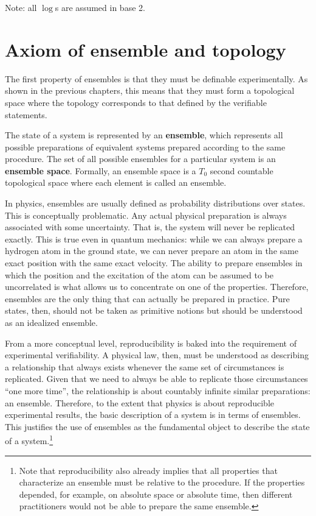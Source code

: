 Note: all $\log$s are assumed in base 2.

\section{Axiom of ensemble and topology}

The first property of ensembles is that they must be definable experimentally. As shown in the previous chapters, this means that they must form a topological space where the topology corresponds to that defined by the verifiable statements.

\begin{mathSection}
	\begin{axiom} 
		The state of a system is represented by an \textbf{ensemble}, which represents all possible preparations of equivalent systems prepared according to the same procedure. The set of all possible ensembles for a particular system is an \textbf{ensemble space}. Formally, an ensemble space is a $T_0$ second countable topological space where each element is called an ensemble.
	\end{axiom}
	
	\begin{justification}
		In physics, ensembles are usually defined as probability distributions over states. This is conceptually problematic. Any actual physical preparation is always associated with some uncertainty. That is, the system will never be replicated exactly. This is true even in quantum mechanics: while we can always prepare a hydrogen atom in the ground state, we can never prepare an atom in the same exact position with the same exact velocity. The ability to prepare ensembles in which the position and the excitation of the atom can be assumed to be uncorrelated is what allows us to concentrate on one of the properties. Therefore, ensembles are the only thing that can actually be prepared in practice. Pure states, then, should not be taken as primitive notions but should be understood as an idealized ensemble. 
		
		From a more conceptual level, reproducibility is baked into the requirement of experimental verifiability. A physical law, then, must be understood as describing a relationship that always exists whenever the same set of circumstances is replicated. Given that we need to always be able to replicate those circumstances ``one more time'', the relationship is about countably infinite similar preparations: an ensemble. Therefore, to the extent that physics is about reproducible experimental results, the basic description of a system is in terms of ensembles. This justifies the use of ensembles as the fundamental object to describe the state of a system.\footnote{Note that reproducibility also already implies that all properties that characterize an ensemble must be relative to the procedure. If the properties depended, for example, on absolute space or absolute time, then different practitioners would not be able to prepare the same ensemble.}
		

\end{justification}
\end{mathSection}
